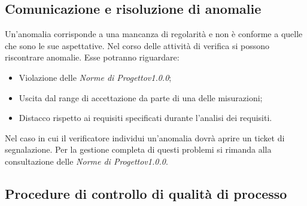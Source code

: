 \subsection{Comunicazione e risoluzione di anomalie}
Un'anomalia corrisponde a una mancanza di regolarità e non è conforme a quelle che sono le sue aspettative. Nel corso delle attività di verifica si possono riscontrare anomalie. Esse potranno riguardare:
\begin{itemize}
	\item Violazione delle \textit{Norme di Progettov1.0.0};
	\item Uscita dal range di accettazione da parte di una delle misurazioni;
	\item Distacco rispetto ai requisiti specificati durante l'analisi dei requisiti.
\end{itemize}
Nel caso in cui il verificatore individui un'anomalia dovrà aprire un ticket di segnalazione. Per la gestione completa di questi problemi si rimanda alla consultazione delle \textit{Norme di Progettov1.0.0}.

\subsection{Procedure di controllo di qualità di processo}
